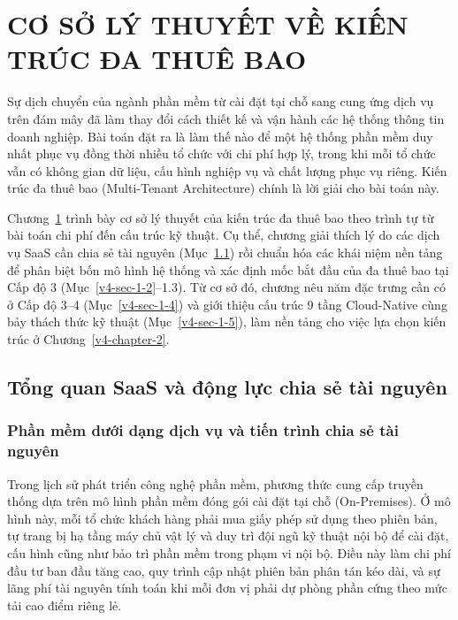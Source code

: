 \chapter{CƠ SỞ LÝ THUYẾT VỀ KIẾN TRÚC ĐA THUÊ BAO}\label{v4-chapter-1}

Sự dịch chuyển của ngành phần mềm từ cài đặt tại chỗ sang cung ứng dịch vụ trên đám mây đã làm thay đổi cách thiết kế và vận hành các hệ thống thông tin doanh nghiệp. Bài toán đặt ra là làm thế nào để một hệ thống phần mềm duy nhất phục vụ đồng thời nhiều tổ chức với chi phí hợp lý, trong khi mỗi tổ chức vẫn có không gian dữ liệu, cấu hình nghiệp vụ và chất lượng phục vụ riêng. Kiến trúc đa thuê bao (Multi-Tenant Architecture) chính là lời giải cho bài toán này.

Chương~\ref{v4-chapter-1} trình bày cơ sở lý thuyết của kiến trúc đa thuê bao theo trình tự từ bài toán chi phí đến cấu trúc kỹ thuật. Cụ thể, chương giải thích lý do các dịch vụ SaaS cần chia sẻ tài nguyên (Mục~\ref{v4-sec-1-1}) rồi chuẩn hóa các khái niệm nền tảng để phân biệt bốn mô hình hệ thống và xác định mốc bắt đầu của đa thuê bao tại Cấp độ 3 (Mục~\ref{v4-sec-1-2}--1.3). Từ cơ sở đó, chương nêu năm đặc trưng cần có ở Cấp độ 3--4 (Mục~\ref{v4-sec-1-4}) và giới thiệu cấu trúc 9 tầng Cloud-Native cùng bảy thách thức kỹ thuật (Mục~\ref{v4-sec-1-5}), làm nền tảng cho việc lựa chọn kiến trúc ở Chương~\ref{v4-chapter-2}.

\section{Tổng quan SaaS và động lực chia sẻ tài nguyên}\label{v4-sec-1-1}

\subsection{Phần mềm dưới dạng dịch vụ và tiến trình chia sẻ tài nguyên}\label{v4-sec-1-1-1}

Trong lịch sử phát triển công nghệ phần mềm, phương thức cung cấp truyền thống dựa trên mô hình phần mềm đóng gói cài đặt tại chỗ (On-Premises). Ở mô hình này, mỗi tổ chức khách hàng phải mua giấy phép sử dụng theo phiên bản, tự trang bị hạ tầng máy chủ vật lý và duy trì đội ngũ kỹ thuật nội bộ để cài đặt, cấu hình cũng như bảo trì phần mềm trong phạm vi nội bộ. Điều này làm chi phí đầu tư ban đầu tăng cao, quy trình cập nhật phiên bản phân tán kéo dài, và sự lãng phí tài nguyên tính toán khi mỗi đơn vị phải dự phòng phần cứng theo mức tải cao điểm riêng lẻ.

